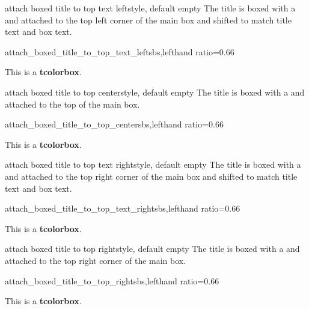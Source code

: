 \begin{docTcbKey}[][doc new=2021-07-30]{attach boxed title to top text left}{}{style, default empty}
The title is boxed with a  and attached to
the top left corner of the main box
and shifted to match title text and box text.
\begin{exdispExample*}{attach_boxed_title_to_top_text_left}{sbs,lefthand ratio=0.66}
\begin{tcolorbox}[enhanced,title=My title,
  attach boxed title to top text left]
  This is a \textbf{tcolorbox}.
\end{tcolorbox}
\end{exdispExample*}
\end{docTcbKey}

\begin{docTcbKey}{attach boxed title to top center}{}{style, default empty}
The title is boxed with a  and attached to
the top of the main box.
\begin{exdispExample*}{attach_boxed_title_to_top_center}{sbs,lefthand ratio=0.66}
\begin{tcolorbox}[enhanced,title=My title,
  attach boxed title to top center]
  This is a \textbf{tcolorbox}.
\end{tcolorbox}
\end{exdispExample*}
\end{docTcbKey}

\begin{docTcbKey}[][doc new=2021-07-30]{attach boxed title to top text right}{}{style, default empty}
The title is boxed with a  and attached to
the top right corner of the main box
and shifted to match title text and box text.
\begin{exdispExample*}{attach_boxed_title_to_top_text_right}{sbs,lefthand ratio=0.66}
\begin{tcolorbox}[enhanced,title=My title,
  halign=right,
  attach boxed title to top text right]
  This is a \textbf{tcolorbox}.
\end{tcolorbox}
\end{exdispExample*}
\end{docTcbKey}


\begin{docTcbKey}{attach boxed title to top right}{}{style, default empty}
The title is boxed with a  and attached to
the top right corner of the main box.
\begin{exdispExample*}{attach_boxed_title_to_top_right}{sbs,lefthand ratio=0.66}
\begin{tcolorbox}[enhanced,title=My title,
  attach boxed title to top right]
  This is a \textbf{tcolorbox}.
\end{tcolorbox}
\end{exdispExample*}
\end{docTcbKey}

